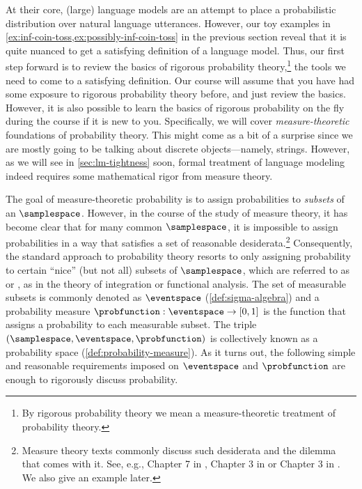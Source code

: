\label{sec:measure-theory}

At their core, (large) language models are an attempt to place a probabilistic distribution over natural language utterances.
However, our toy examples in \cref{ex:inf-coin-toss,ex:possibly-inf-coin-toss} in the previous section reveal that it is quite nuanced to get a satisfying definition of a language model.
Thus, our first step forward is to review the basics of rigorous probability theory,\footnote{By rigorous probability theory we mean a measure-theoretic treatment of probability theory.} the tools we need to come to a satisfying definition. 
Our course will assume that you have had some exposure to rigorous probability theory before, and just review the basics.
However, it is also possible to learn the basics of rigorous probability on the fly during the course if it is new to you.
Specifically, we will cover \emph{measure-theoretic} foundations of probability theory.
This might come as a bit of a surprise since we are mostly going to be talking about discrete objects---namely, strings.
However, as we will see in \cref{sec:lm-tightness} soon, formal treatment of language modeling indeed requires some mathematical rigor from measure theory.

The goal of measure-theoretic probability is to assign probabilities to \emph{subsets}
of an  $\samplespace$. 
However, in the course of the study of measure theory, it has become clear that for many common $\samplespace$, it is impossible to assign probabilities in a way that satisfies a set of reasonable desiderata.\footnote{Measure theory texts commonly discuss such desiderata and the dilemma that comes with it. See, e.g., Chapter 7 in \citet{Tao2016}, Chapter 3 in \citet{Royden1988} or Chapter 3 in \citet{Billingsley1986}. 
We also give an example later.} 
Consequently, the standard approach to probability theory resorts to only assigning probability to certain ``nice'' (but not all) subsets of $\samplespace$, which are referred to as  or , as in the theory of integration or functional analysis.
The set of measurable subsets is commonly denoted as $\eventspace$ (\cref{def:sigma-algebra}) and a probability measure $\probfunction:\eventspace\to[0,1]$ is the function that assigns a probability to each measurable subset. 
The triple $(\samplespace,\eventspace,\probfunction)$ is collectively known as a probability space (\cref{def:probability-measure}).
As it turns out, the following simple and reasonable requirements imposed on $\eventspace$ and $\probfunction$ are enough to rigorously discuss probability.

